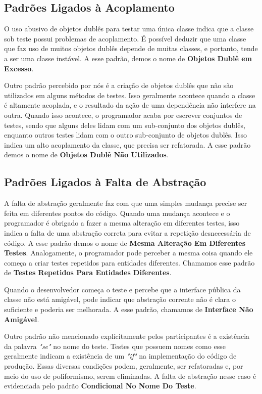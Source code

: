 \subsection{Padrões Ligados à Acoplamento}

O uso abusivo de objetos dublês para testar uma
única classe indica que a classe sob teste possui problemas
de acoplamento. É possível deduzir que uma classe que faz uso de muitos
objetos dublês depende de muitas classes, e portanto, tende a ser
uma classe instável. A esse padrão, demos o nome de \textbf{Objetos Dublê em Excesso}.

Outro padrão percebido por nós é a criação de objetos dublês que não
são utilizados em alguns métodos de testes. Isso geralmente acontece quando
a classe é altamente acoplada, e o resultado da ação de uma dependência não
interfere na outra. Quando isso acontece, o programador acaba por escrever
conjuntos de testes, sendo que alguns deles lidam com um sub-conjunto dos objetos dublês,
enquanto outros testes lidam com o outro sub-conjunto de objetos dublês. 
Isso indica um alto acoplamento 
da classe, que precisa ser refatorada. A esse padrão demos o nome de
\textbf{Objetos Dublê Não Utilizados}.


\subsection{Padrões Ligados à Falta de Abstração}

A falta de abstração geralmente faz com que uma simples mudança precise
ser feita em diferentes pontos do código. Quando uma mudança acontece e 
o programador é obrigado a fazer a mesma alteração em diferentes testes,
isso indica a falta de uma abstração correta para evitar a 
repetição desnecessária de código.
A esse padrão demos o nome de \textbf{Mesma Alteração Em Diferentes Testes}.
Analogamente, o programador pode perceber a mesma coisa
quando ele começa a criar testes repetidos para entidades diferentes.
Chamamos esse padrão de \textbf{Testes Repetidos Para Entidades Diferentes}.

Quando o desenvolvedor começa o teste e percebe que a interface pública da classe
não está amigável, pode indicar que abstração
corrente não é clara o suficiente e poderia ser melhorada. A esse padrão,
chamamos de \textbf{Interface Não Amigável}.

Outro padrão não mencionado explícitamente pelos participantes 
é a existência da palavra \textit{"se"} no nome do teste. Testes que
possuem nomes como esse geralmente indicam a existência de um \textit{"if"} na implementação
do código de produção. Essas diversas condições podem, geralmente, ser refatoradas e,
por meio do uso de poliformismo, serem eliminadas. A falta de abstração nesse caso
é evidenciada pelo padrão \textbf{Condicional No Nome Do Teste}.

